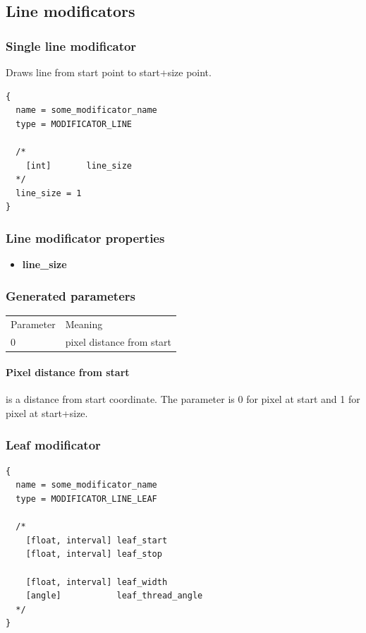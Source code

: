 \documentclass[9pt]{article}
\begin{document}
\subsection{Line modificators}
\subsubsection{Single line modificator}

Draws line from start point to start+size point.

\begin{verbatim}
{
  name = some_modificator_name
  type = MODIFICATOR_LINE

  /*
    [int]       line_size    
  */
  line_size = 1
}
\end{verbatim}
\subsubsection*{Line modificator properties}
\begin{itemize}
\item{\bf line\_size}
\end{itemize}

\subsubsection*{Generated parameters}

\begin{tabular}{|l||l|}
  Parameter & Meaning \\
  0 & pixel distance from start \\
\end{tabular}

\paragraph*{Pixel distance from start} is a distance from start coordinate. 
The parameter is 0 for pixel at start and 1 for pixel at start+size.

\subsubsection{Leaf modificator}

\begin{verbatim}
{
  name = some_modificator_name
  type = MODIFICATOR_LINE_LEAF

  /*
    [float, interval] leaf_start
    [float, interval] leaf_stop
  
    [float, interval] leaf_width
    [angle]           leaf_thread_angle
  */
}
\end{verbatim}
\end{document}
